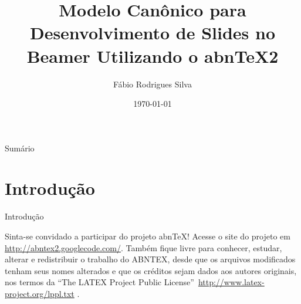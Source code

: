 \documentclass[aspectratio=169]{beamer}	 	%
\title{Modelo Canônico para Desenvolvimento de Slides no Beamer Utilizando o abnTeX2}
\author{Fábio Rodrigues Silva}
\institute{Universidade do Brasil
	    \par
	    Faculdade de Arquitetura da Informação}
\date{\today}
\begin{document}

\begin{frame}{Sumário}
\tableofcontents
\end{frame}

\section{Introdução}

\begin{frame}{Introdução}

Sinta-se convidado a participar do projeto abnTeX! Acesse o site do projeto em
\url{http://abntex2.googlecode.com/}. Também fique livre para conhecer,
estudar, alterar e redistribuir o trabalho do ABNTEX, desde que os arquivos
modificados tenham seus nomes alterados e que os créditos sejam dados aos
autores originais, nos termos da ``The LATEX Project Public
License''\ \url{http://www.latex-project.org/lppl.txt} \cite[p. 31]{abntex2modelo}.

\end{frame}

\end{document}
